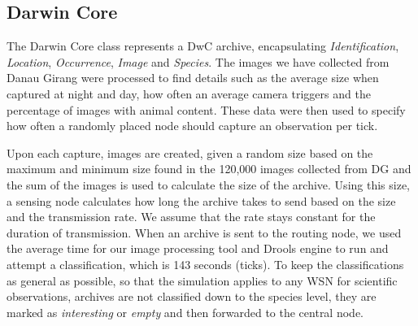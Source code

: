 
\subsection{Darwin Core}
The Darwin Core class represents a DwC archive, encapsulating \textit{Identification}, \textit{Location}, \textit{Occurrence}, \textit{Image} and \textit{Species}. The images we have collected from Danau Girang were processed to find details such as the average size when captured at night and day, how often an average camera triggers and the percentage of images with animal content. These data were then used to specify how often a randomly placed node should capture an observation per tick.

Upon each capture, images are created, given a random size based on the maximum and minimum size found in the 120,000 images collected from DG and the sum of the images is used to calculate the size of the archive. Using this size, a sensing node calculates how long the archive takes to send based on the size and the transmission rate. We assume that the rate stays constant for the duration of transmission.
When an archive is sent to the routing node, we used the average time for our image processing tool and Drools engine to run and attempt a classification, which is 143 seconds (ticks). To keep the classifications as general as possible, so that the simulation applies to any WSN for scientific observations, archives are not classified down to the species level, they are marked as \textit{interesting} or \textit{empty} and then forwarded to the central node.

